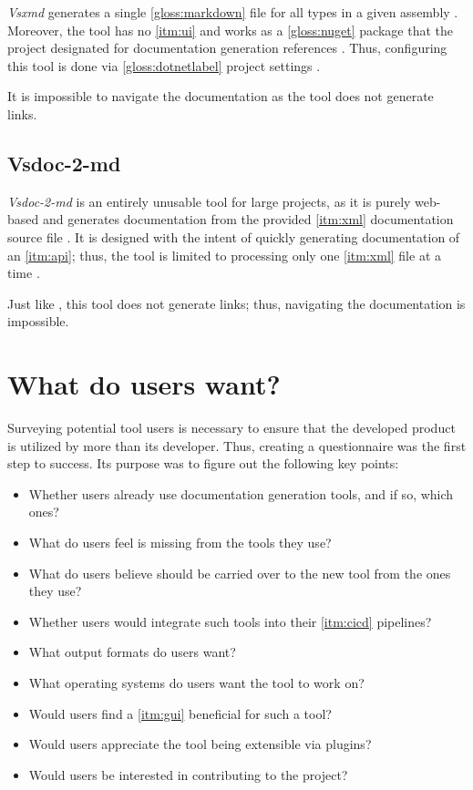 \textit{Vsxmd} generates a single \ref{gloss:markdown} file for all types in a given assembly \cite{petrakis_vsxmdreadmemd_2022}. Moreover, the tool has no \ref{itm:ui} and works as a \ref{gloss:nuget} package that the project designated for documentation generation references \cite{petrakis_vsxmdreadmemd_2022}. Thus, configuring this tool is done via \ref{gloss:dotnetlabel} project settings \cite{petrakis_vsxmdreadmemd_2022}.

It is impossible to navigate the documentation as the tool does not generate links.

\subsection{Vsdoc-2-md}

\textit{Vsdoc-2-md} is an entirely unusable tool for large projects, as it is purely web-based and generates documentation from the provided \ref{itm:xml} documentation source file \cite{varus_discosultanvsdoc-2-md_2022}. It is designed with the intent of quickly generating documentation of an \ref{itm:api}; thus, the tool is limited to processing only one \ref{itm:xml} file at a time \cite{varus_discosultanvsdoc-2-md_2022}.

Just like \textit{}, this tool does not generate links; thus, navigating the documentation is impossible.

\section{What do users want?} \label{sec:whatdouserswant}
Surveying potential tool users is necessary to ensure that the developed product is utilized by more than its developer.
Thus, creating a questionnaire was the first step to success. Its purpose was to figure out the following key points:
\begin{itemize}
    \item Whether users already use documentation generation tools, and if so, which ones?
    \item What do users feel is missing from the tools they use?
    \item What do users believe should be carried over to the new tool from the ones they use?
    \item Whether users would integrate such tools into their \ref{itm:cicd} pipelines?
    \item What output formats do users want?
    \item What operating systems do users want the tool to work on?
    \item Would users find a \ref{itm:gui} beneficial for such a tool?
    \item Would users appreciate the tool being extensible via plugins?
    \item Would users be interested in contributing to the project?
\end{itemize}

